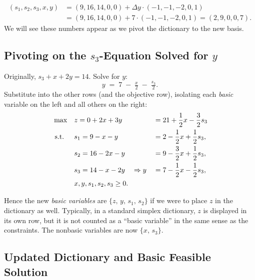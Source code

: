 \begin{align*}
 (s_1, s_2, s_3, x,y) &= (9,16,14,0,0) + \Delta y \cdot (-1, -1, -2, 0,1)\\
 &= (9,16,14,0,0) + 7\cdot (-1, -1, -2, 0,1)  = (2,9,0,0,7).
\end{align*}
We will see these numbers appear as we pivot the dictionary to the new basis.

\subsection*{Pivoting on the \(s_3\)-Equation Solved for \(y\)}

Originally, \(s_3 + x + 2y = 14\).  Solve for \(y\):
\[
y \;=\; 7 \;-\; \tfrac{x}{2} \;-\; \tfrac{s_3}{2}.
\]
Substitute into the other rows (and the objective row), isolating each \emph{basic} variable on the left and all others on the right:
\[
\begin{aligned}
\max\quad 
& z = 0+ 2x + 3y \quad && = 21 + \frac{1}{2}x - \frac{3}{2}s_3 \\
\text{ s.t. }\quad 
& s_1 = 9 - x - y \quad && = 2 - \frac{1}{2}x + \frac{1}{2}s_3, \\
& s_2 = 16 - 2x - y \quad &&= 9 - \frac{3}{2}x + \frac{1}{2}s_3, \\
& s_3 = 14 - x - 2y \quad \Rightarrow y &&= 7 - \frac{1}{2}x - \frac{1}{2}s_3, \\
& x, y, s_1, s_2, s_3 \ge 0.
\end{aligned}
\]

\noindent
Hence the new \emph{basic variables} are \(\{z,\,y,\,s_1,\,s_2\}\) if we were to place \(z\) in the dictionary as well.  Typically, in a standard simplex dictionary, \(z\) is displayed in its own row, but it is not counted as a “basic variable” in the same sense as the constraints.  The nonbasic variables are now \(\{x,\,s_3\}\).

\subsection*{Updated Dictionary and Basic Feasible Solution}

